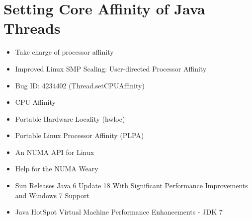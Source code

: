 
\chapter{Setting Core Affinity of Java Threads}
\label{chap:appendix-core-affinity}











\begin{itemize}
\item Take charge of processor affinity \cite{Dow2005}
\item Improved Linux SMP Scaling: User-directed Processor Affinity
  \cite{Foong2008}
\item Bug ID: 4234402 (Thread.setCPUAffinity) \cite{Oracle1999}
\item CPU Affinity \cite{Love2003}
\item Portable Hardware Locality (hwloc) \cite{OpenMPI2010}
\item Portable Linux Processor Affinity (PLPA) \cite{OpenMPI2010}
\item An NUMA API for Linux \cite{Kleen2004}
\item Help for the NUMA Weary \cite{Masamitsu2008}
\item[\checkmark] Sun Releases Java 6 Update 18 With Significant
  Performance Improvements and Windows 7 Support \cite{Humble2010}
\item[\checkmark] Java HotSpot Virtual Machine Performance
  Enhancements - JDK 7 \cite{Oracle2010}
\end{itemize}


